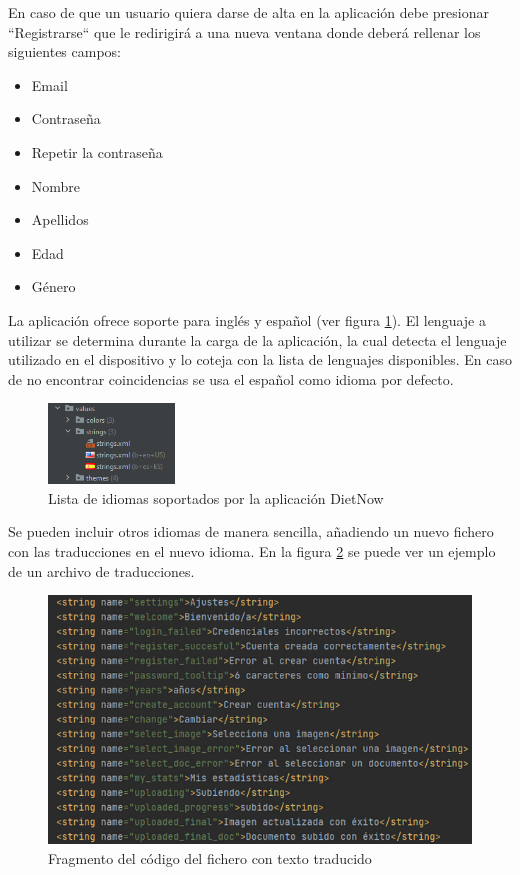 En caso de que un usuario quiera darse de alta en la aplicación debe presionar ``Registrarse`` que le redirigirá a una nueva ventana donde deberá rellenar los siguientes campos:
\begin{itemize}
    \item Email
    \item Contraseña
    \item Repetir la contraseña
    \item Nombre
    \item Apellidos
    \item Edad
    \item Género
\end{itemize}
La aplicación ofrece soporte para inglés y español (ver figura \ref{fig:idiomas}). El lenguaje a utilizar se determina durante la carga de la aplicación, la cual detecta el lenguaje utilizado en el dispositivo y lo coteja con la lista de lenguajes disponibles. En caso de no encontrar coincidencias se usa el español como idioma por defecto.
\begin{figure}[H]
    \centering
    \includegraphics[width=0.3\textwidth]{Images/Capitulo7/idiomas.png}
    \caption{Lista de idiomas soportados por la aplicación DietNow}
    \label{fig:idiomas}
\end{figure}

Se pueden incluir otros idiomas de manera sencilla, añadiendo un nuevo fichero con las traducciones en el nuevo idioma. En la figura \ref{fig:idiomastext} se puede ver un ejemplo de un archivo de traducciones.
\begin{figure}[H]
    \centering
    \includegraphics[width=\textwidth]{Images/Capitulo7/idiomastext.png}
    \caption{Fragmento del código del fichero con texto traducido}
    \label{fig:idiomastext}
\end{figure}

